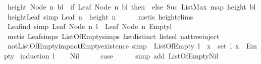 \begin{isabellebody}
{\isacharbar}\ {\isachardoublequoteopen}height\ {\isacharparenleft}Node\ n\ bl{\isacharparenright}\ {\isacharequal}\ {\isacharparenleft}if\ Leaf\ {\isacharparenleft}Node\ n\ bl{\isacharparenright}\ then\ {}\ else\ Suc\ {\isacharparenleft}ListMax\ {\isacharparenleft}map\ height\ bl{\isacharparenright}{\isacharparenright}{\isacharparenright}{\isachardoublequoteclose}\isanewline
\isanewline
{}\isamarkupfalse%
\ height{\isacharunderscore}Leaf\ {\isacharbrackleft}simp{\isacharbrackright}{\isacharcolon}\ {\isachardoublequoteopen}Leaf\ n\ {\isasymlongrightarrow}\ height\ n\ {\isacharequal}\ {}{\isachardoublequoteclose}\isanewline
%
\isadelimproof
\ \ %
\endisadelimproof
%
\isatagproof
{}\isamarkupfalse%
\ {\isacharparenleft}metis\ height{\isachardot}elims{\isacharparenright}%
\endisatagproof
{\isafoldproof}%
%
\isadelimproof
\isanewline
%
\endisadelimproof
\isanewline
{}\isamarkupfalse%
\ Leaf{\isacharunderscore}ind\ {\isacharbrackleft}simp{\isacharbrackright}{\isacharcolon}\ {\isachardoublequoteopen}Leaf\ {\isacharparenleft}Node\ n\ l{\isacharparenright}\ {\isacharequal}\ Leaf\ {\isacharparenleft}Node\ n\ {\isacharparenleft}Empty{\isacharhash}l{\isacharparenright}{\isacharparenright}{\isachardoublequoteclose}\isanewline
%
\isadelimproof
\ \ %
\endisadelimproof
%
\isatagproof
{}\isamarkupfalse%
\ {\isacharparenleft}metis\ Leaf{\isachardot}simps\ ListOfEmpty{\isachardot}simps\ list{\isachardot}distinct{\isacharparenleft}{}{\isacharparenright}\ list{\isachardot}sel{\isacharparenleft}{}{\isacharparenright}\ nattree{\isachardot}inject{\isacharparenright}%
\endisatagproof
{\isafoldproof}%
%
\isadelimproof
\isanewline
%
\endisadelimproof
\isanewline
{}\isamarkupfalse%
\ not{\isacharunderscore}ListOfEmpty{\isacharunderscore}imp{\isacharunderscore}not{\isacharunderscore}Empty{\isacharunderscore}existence\ {\isacharbrackleft}simp{\isacharbrackright}\ {\isacharcolon}{\isachardoublequoteopen}{\isasymnot}\ ListOfEmpty\ l\ {\isasymlongrightarrow}\ {\isacharparenleft}{\isasymexists}x\ {\isasymin}\ set\ l{\isachardot}\ x\ {\isasymnoteq}\ Empty{\isacharparenright}{\isachardoublequoteclose}\isanewline
%
\isadelimproof
%
\endisadelimproof
%
\isatagproof
{}\isamarkupfalse%
\ {\isacharparenleft}induction\ l{\isacharparenright}\isanewline
\ \ \isamarkupfalse%
\ Nil\isanewline
\ \ \isamarkupfalse%
\ \isamarkupfalse%
\ {\isacharquery}case\isanewline
\ \ \ \ \isamarkupfalse%
\ {\isacharparenleft}simp\ add{\isacharcolon}\ ListOfEmpty{\isachardot}Nil{\isacharparenright}\ \isanewline

\end{isabellebody}
